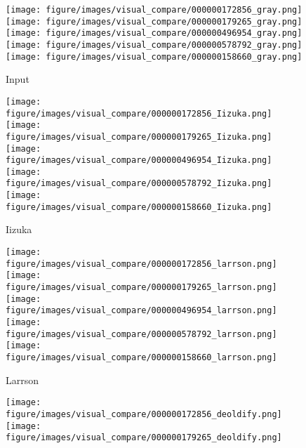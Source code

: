 {\begin{figure*}[!t]
    \begin{subfigure}[t]{.16\linewidth}
       \texttt{[image: figure/images/visual\_compare/000000172856\_gray.png]}
       \texttt{[image: figure/images/visual\_compare/000000179265\_gray.png]}
       \texttt{[image: figure/images/visual\_compare/000000496954\_gray.png]}
       \texttt{[image: figure/images/visual\_compare/000000578792\_gray.png]}
       \texttt{[image: figure/images/visual\_compare/000000158660\_gray.png]}
       \caption{Input}
    \end{subfigure}
    \hfill
    \begin{subfigure}[t]{.16\linewidth}
       \texttt{[image: figure/images/visual\_compare/000000172856\_Iizuka.png]}
       \texttt{[image: figure/images/visual\_compare/000000179265\_Iizuka.png]}
       \texttt{[image: figure/images/visual\_compare/000000496954\_Iizuka.png]}
       \texttt{[image: figure/images/visual\_compare/000000578792\_Iizuka.png]}
       \texttt{[image: figure/images/visual\_compare/000000158660\_Iizuka.png]}
       \caption{Iizuka~\etal~\cite{Iizuka-SIGGRAPH-2016}}
    \end{subfigure}
    \hfill
    \begin{subfigure}[t]{.16\linewidth}
       \texttt{[image: figure/images/visual\_compare/000000172856\_larrson.png]}
       \texttt{[image: figure/images/visual\_compare/000000179265\_larrson.png]}
       \texttt{[image: figure/images/visual\_compare/000000496954\_larrson.png]}
       \texttt{[image: figure/images/visual\_compare/000000578792\_larrson.png]}
       \texttt{[image: figure/images/visual\_compare/000000158660\_larrson.png]}
       \caption{Larrson~\etal~\cite{larsson2017colorization}}
    \end{subfigure}
    \hfill
    \begin{subfigure}[t]{.16\linewidth}
       \texttt{[image: figure/images/visual\_compare/000000172856\_deoldify.png]}
       \texttt{[image: figure/images/visual\_compare/000000179265\_deoldify.png]}

\end{subfigure}
\end{figure*}}
